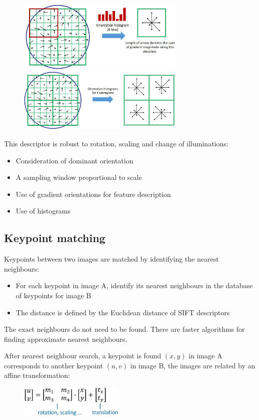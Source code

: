 \documentclass{report}
\begin{document}
\begin{figure}[h]
    \centering
    \includegraphics[width=8cm]{local image 1.JPG}
    \hspace{1cm}
    \includegraphics[width=8cm]{local image 2.JPG}
\end{figure}

This descriptor is robust to rotation, scaling and change of illuminations:
\begin{itemize}
    \item Consideration of dominant orientation
    \item A sampling window proportional to scale
    \item Use of gradient orientations for feature description
    \item Use of histograms
\end{itemize}

\subsection{Keypoint matching}

Keypoints between two images are matched by identifying the nearest neighbours:
\begin{itemize}
    \item For each keypoint in image A, identify its nearest neighbours in the database of
    keypoints for image B
    \item The distance is defined by the Euclidean distance of SIFT descriptors
\end{itemize}

The exact neighbours do not need to be found. There are faster algorithms for
finding approximate nearest neighbours.

\pagebreak

After nearest neighbour search, a keypoint is found $(x,y)$ in image A
corresponds to another keypoint $(u,v)$ in image B, the images are related by an
affine transformation:
\begin{figure}[h!]
    \centering
    \includegraphics[width=5cm]{affine.JPG}
\end{figure}
\end{document}
